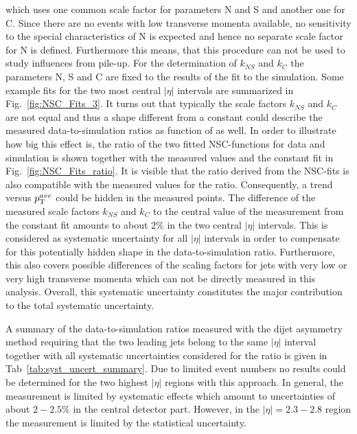 \begin{description}
which uses one common scale factor for parameters N and S and another one for C. Since there are no events with low transverse momenta available, no sensitivity to the special characteristics of N is expected and hence no separate scale factor for N is defined. Furthermore this means, that this procedure can not be used to study influences from pile-up. For the determination of $k_{NS}$ and $k_{C}$ the parameters N, S and C are fixed to the results of the fit to the simulation. Some example fits for the two most central $|\eta|$ intervals are summarized in Fig.~\ref{fig:NSC_Fits_3}. It turns out that typically the scale factors $k_{NS}$ and $k_{C}$ are not equal and thus a shape different from a constant could describe the measured data-to-simulation ratios as function of \ptave as well. In order to illustrate how big this effect is, the ratio of the two fitted NSC-functions for data and simulation is shown together with the measured values and the constant fit in Fig.~\ref{fig:NSC_Fits_ratio}. It is visible that the ratio derived from the NSC-fits is also compatible with the measured values for the ratio. Consequently, a trend versus $p_{\text{T}}^{ave}$ could be hidden in the measured points. The difference of the measured scale factors $k_{NS}$ and $k_{C}$ to the central value of the measurement from the constant fit amounts to about $2\%$ in the two central $|\eta|$ intervals. This is considered as systematic uncertainty for all $|\eta|$ intervals in order to compensate for this potentially hidden shape in the data-to-simulation ratio. Furthermore, this also covers possible differences of the scaling factors for jets with very low or very high transverse momenta which can not be directly measured in this analysis. Overall, this systematic uncertainty constitutes the major contribution to the total systematic uncertainty.

\end{description}

A summary of the data-to-simulation ratios measured with the dijet asymmetry method requiring that the two leading jets belong to the same $|\eta|$ interval together with all systematic uncertainties considered for the ratio is given in Tab~\ref{tab:syst_uncert_summary}. Due to limited event numbers no results could be determined for the two highest $|\eta|$ regions with this approach. In general, the measurement is limited by systematic effects which amount to uncertainties of about $2-2.5\%$ in the central detector part. However, in the $|\eta| = 2.3-2.8$ region the measurement is limited by the statistical uncertainty.   

